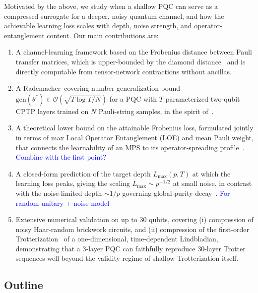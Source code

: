 \documentclass[%
 reprint,
superscriptaddress,
 amsmath,amssymb,
 aps,
]{revtex4-2}
\newcommand{\yijian}[1]{\textcolor{blue}{#1}}
\begin{document}
Motivated by the above, we study when a shallow PQC can serve as a compressed surrogate for a deeper, noisy quantum channel, and how the achievable learning loss scales with depth, noise strength, and operator-entanglement content. Our main contributions are:
\begin{enumerate}
    \item A channel-learning framework based on the Frobenius distance between Pauli transfer matrices, which is upper-bounded by the diamond distance~\cite{nielsen2010quantum} and is directly computable from tensor-network contractions without ancillas. 
    \item A Rademacher--covering-number generalization bound $\mathrm{gen}(\theta^*)\in\mathcal{O}(\sqrt{T\log T / N})$ for a PQC with $T$ parameterized two-qubit CPTP layers trained on $N$ Pauli-string samples, in the spirit of~\cite{caro2022generalization}.
    \item A theoretical lower bound on the attainable Frobenius loss, formulated jointly in terms of max Local Operator Entanglement (LOE) and mean Pauli weight, that connects the learnability of an MPS to its operator-spreading profile~\cite{nahum2018operator,vonKeyserlingk2018operatorhydrodynamics,prosen2007operator}. \yijian{Combine with the first point?}
    \item A closed-form prediction of the target depth $L_{\max}(p,T)$ at which the learning loss peaks, giving the scaling $L_{\max}\sim p^{-1/2}$ at small noise, in contrast with the noise-limited depth $\sim 1/p$ governing global-purity decay~\cite{aharonov2023polynomial,deshpande2022tight}. \yijian{For random unitary + noise model}
    \item Extensive numerical validation on up to 30 qubits, covering (i) compression of noisy Haar-random brickwork circuits, and (ii) compression of the first-order Trotterization~\cite{lloyd1996universal} of a one-dimensional, time-dependent Lindbladian, demonstrating that a 3-layer PQC can faithfully reproduce 30-layer Trotter sequences well beyond the validity regime of shallow Trotterization itself.
\end{enumerate}

\subsection*{Outline}
\end{document}
